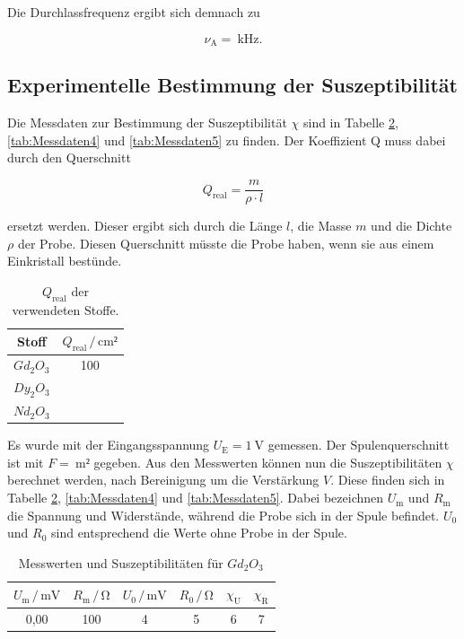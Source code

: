 Die Durchlassfrequenz ergibt sich demnach zu 

\begin{equation}
\nu _\text{A} = \SI{}{\kilo\hertz}.
\end{equation}

\subsection{Experimentelle Bestimmung der Suszeptibilität}

Die Messdaten zur Bestimmung der Suszeptibilität $\chi$ sind in Tabelle 
\ref{tab:Messdaten3}, \ref{tab:Messdaten4} und \ref{tab:Messdaten5} zu finden. 
Der Koeffizient Q muss dabei durch den Querschnitt

\begin{equation}
Q_\text{real} = \frac{m}{\rho \cdot l}
\end{equation}

ersetzt werden. Dieser ergibt sich durch die Länge $l$, die Masse $m$ und 
die Dichte $\rho$ der Probe. Diesen Querschnitt müsste die Probe haben, wenn 
sie aus einem Einkristall bestünde.

\begin{table}
\centering
\caption{$Q_\text{real}$ der verwendeten Stoffe.}
\label{tab:Messdaten2}
\begin{tabular}{c c}
\toprule
Stoff & $Q_\text{real} \,/\, \si{\centi\meter²}$\\
\midrule
$Gd_2O_3$ & 100\\
$Dy_2O_3$ &\\
$Nd_2O_3$ &\\
\bottomrule
\end{tabular}
\end{table}

Es wurde mit der Eingangsspannung $U_\text{E} = \SI{1}{\volt}$ gemessen. Der 
Spulenquerschnitt ist mit $F = \SI{}{\meter²}$ gegeben. Aus den Messwerten 
können nun die Suszeptibilitäten $\chi$ berechnet werden, nach Bereinigung 
um die Verstärkung $V$. Diese finden sich in Tabelle \ref{tab:Messdaten3}, 
\ref{tab:Messdaten4} und \ref{tab:Messdaten5}.
Dabei bezeichnen $U_\text{m}$ und $R_\text{m}$ die Spannung und Widerstände, 
während die Probe sich in der Spule befindet. $U_\text{0}$ und $R_\text{0}$
sind entsprechend die Werte ohne Probe in der Spule. 

\begin{table}
\centering
\caption{Messwerten und Suszeptibilitäten für $Gd_2O_3$}
\label{tab:Messdaten3}
\begin{tabular}{c c c c c c}
\toprule
$U_\text{m} \,/\, \si{\milli\volt}$ & $R_\text{m} \,/\, \si{\ohm}$ & $U_\text{0} \,/\, \si{\milli\volt}$& $R_\text{0} \,/\, \si{\ohm}$ & $\chi _\text{U}$ & $\chi _\text{R}$ \\
\midrule
0,00 & 100 & 4 & 5 & 6 & 7\\
\bottomrule
\end{tabular}
\end{table}

